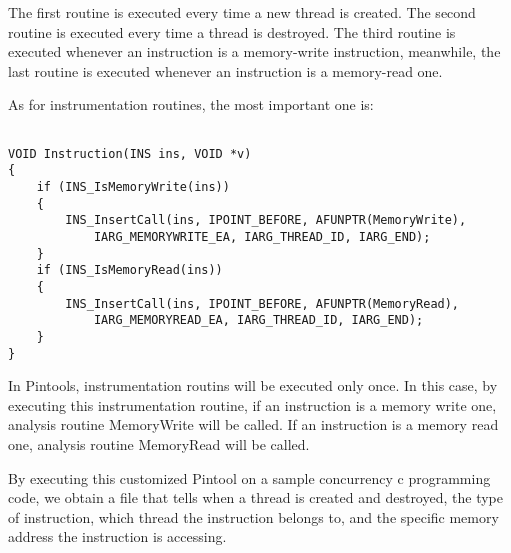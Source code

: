\documentclass[twocolumn]{article}
\begin{document}
The first routine is executed every time a new thread is created. The second routine is executed every time a thread is destroyed. The third routine is executed whenever an instruction is a memory-write instruction, meanwhile, the last routine is executed whenever an instruction is a memory-read one. 

As for instrumentation routines, the most important one is: 

\begin{lstlisting}

VOID Instruction(INS ins, VOID *v)
{
	if (INS_IsMemoryWrite(ins))
	{
		INS_InsertCall(ins, IPOINT_BEFORE, AFUNPTR(MemoryWrite), 
			IARG_MEMORYWRITE_EA, IARG_THREAD_ID, IARG_END);
	}
	if (INS_IsMemoryRead(ins))
	{
		INS_InsertCall(ins, IPOINT_BEFORE, AFUNPTR(MemoryRead), 
			IARG_MEMORYREAD_EA, IARG_THREAD_ID, IARG_END);
	}
}

\end{lstlisting}

In Pintools, instrumentation routins will be executed only once. In this case, by executing this instrumentation routine, if an instruction is a memory write one, analysis routine MemoryWrite will be called. If an instruction is a memory read one, analysis routine MemoryRead will be called. 

By executing this customized Pintool on a sample concurrency c programming code, we obtain a file that tells when a thread is created and destroyed, the type of instruction, which thread the instruction belongs to, and the specific memory address the instruction is accessing. 
\end{document}
